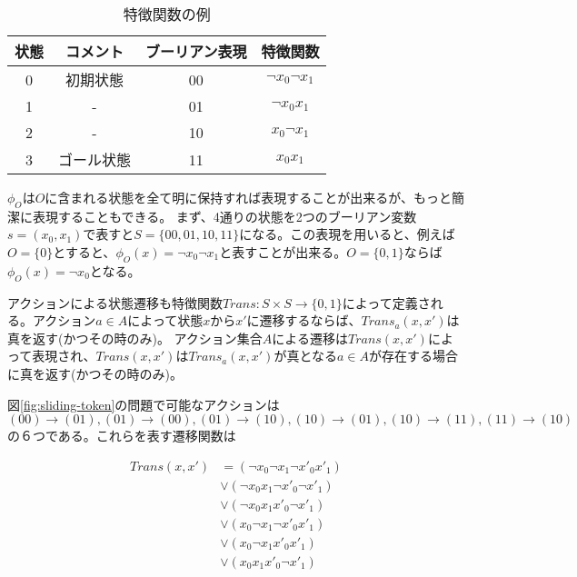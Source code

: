 \begin{table}
\centering
\caption{特徴関数の例}
\label{tbl:sliding-token}
\begin{tabular}{c|c|c|c}
	状態 & コメント & ブーリアン表現 & 特徴関数 \\ \hline
	0		& 初期状態	& 00				& $\lnot x_0 \lnot x_1$ \\	
	1		& -			& 01				& $\lnot x_0  x_1$ \\	
	2		& -			& 10				& $x_0 \lnot x_1$ \\	
	3		& ゴール状態	& 11				& $x_0 x_1$ \\	
\end{tabular}
\end{table}

$\phi_O$は$O$に含まれる状態を全て明に保持すれば表現することが出来るが、もっと簡潔に表現することもできる。
まず、4通りの状態を2つのブーリアン変数 $s = (x_0, x_1)$で表すと$S = \{00, 01, 10, 11\}$になる。この表現を用いると、例えば$O = \{0\}$とすると、$\phi_{O}(x) = \lnot x_0 \lnot x_1$と表すことが出来る。$O = \{0, 1\}$ならば$\phi_{O}(x) = \lnot x_0$となる。


アクションによる状態遷移も特徴関数$Trans: S \times S \rightarrow \{0, 1\}$によって定義される。アクション$a \in A$によって状態$x$から$x'$に遷移するならば、$Trans_a(x,x')$は真を返す(かつその時のみ)。
アクション集合$A$による遷移は$Trans(x,x')$によって表現され、$Trans(x,x')$は$Trans_a(x,x')$が真となる$a \in A$が存在する場合に真を返す(かつその時のみ)。

図\ref{fig:sliding-token}の問題で可能なアクションは$(00) \rightarrow (01), (01) \rightarrow (00), (01) \rightarrow (10), (10) \rightarrow (01), (10) \rightarrow (11), (11) \rightarrow (10)$の６つである。これらを表す遷移関数は

\begin{equation}
\begin{split}
	Trans(x,x') &= (\lnot x_0 \lnot x_1 \lnot x'_0 x'_1) \\
		&\lor (\lnot x_0 x_1 \lnot x'_0 \lnot x'_1) \\
		&\lor (\lnot x_0 x_1 x'_0 \lnot x'_1) \\
		&\lor (x_0 \lnot x_1 \lnot x'_0 x'_1) \\
		&\lor (x_0 \lnot x_1 x'_0 x'_1) \\
		&\lor (x_0 x_1 x'_0 \lnot x'_1)
\end{split}
\end{equation}

